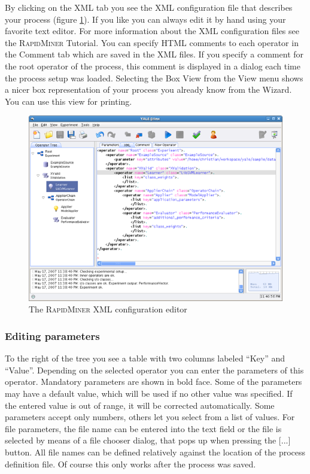 \documentclass[11pt]{article}
\newcommand{\useroption}[1]{\textsf{#1}}
\newcommand{\rapidminer}{\protect \textsc{RapidMiner}\xspace}
\begin{document}
By clicking on the \useroption{XML} tab you see the XML configuration
file that describes your process (figure
\ref{fig:wizard_xml_editing}). If you like you can always edit it by
hand using your favorite text editor. For more information about the
XML configuration files see the \rapidminer Tutorial.
You can specify HTML comments to each operator in the \useroption{Comment} tab which are
saved in the XML files. If you specify a comment for the root operator
of the process, this comment is displayed in a dialog each time the
process setup was loaded.
Selecting the 
\useroption{Box View} from the View menu shows a nicer box representation of your
process you already know from the Wizard. You can use this view for
printing.
\begin{figure}[ht]
\center
\includegraphics[width=0.88\linewidth]{screenshot_xml_edit.png}
\caption{The \rapidminer XML configuration editor }
\label{fig:wizard_xml_editing}
\end{figure}






\subsubsection{Editing parameters}

To the right of the tree you see a table with two columns labeled ``Key''
and ``Value''. Depending on the selected operator you can enter the
parameters of this operator. Mandatory parameters are shown in bold
face. Some of the parameters may have a default value, which will be
used if no other value was specified. If the entered value
is out of range, it will be corrected automatically. Some
parameters accept only numbers, others let you select from a list of
values. For file parameters, the file name can be entered into the text
field or the file is selected by means of a file chooser dialog, that
pops up when pressing the \useroption{[...]} button. All file names
can be defined relatively against the location of the process definition
file. Of course this only works after the process was saved.
\end{document}
